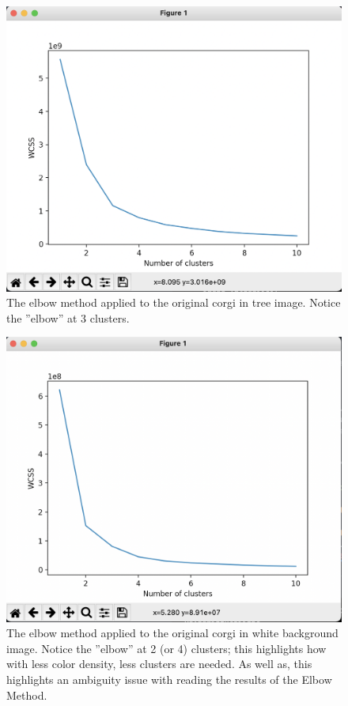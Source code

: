 \documentclass[10pt,twocolumn]{article}
\begin{document}
\begin{figure}[h]
  \centering
  \includegraphics[scale=0.15]{corgi-tree-elbow.png}
  \vspace{20px}
  \caption{The elbow method applied to the original corgi in tree image. Notice the ”elbow” at 3 clusters.}
  \label{ctree:elbow}
\end{figure}

\begin{figure}[h]
  \centering
  \includegraphics[scale=0.15]{corgi-white-elbow.png}
  \vspace{20px}
  \caption{The elbow method applied to the original corgi in white background image. Notice the ”elbow” at 2 (or 4) clusters; this highlights how with less color density, less clusters are needed. As well as, this highlights an ambiguity issue with reading the results of the Elbow Method.}
  \label{cwhite:elbow}
\end{figure}
\end{document}
